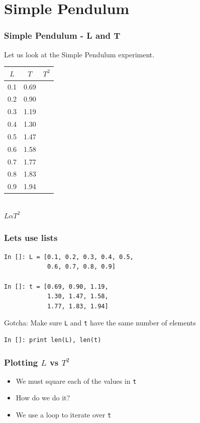 \documentclass[14pt,compress]{beamer}
\newcommand{\typ}[1]{\lstinline{#1}}
\newcommand{\kwrd}[1]{ \texttt{\textbf{\color{blue}{#1}}}  }
\begin{document}
\section{Simple Pendulum}
\begin{frame}[fragile]
\frametitle{Simple Pendulum - L and T}
Let us look at the Simple Pendulum experiment.
\begin{center}
\begin{small}
\begin{tabular}{| c | c | c |}
\hline
$L$ & $T$ & $T^2$ \\ \hline
0.1 & 0.69 & \\ \hline
0.2 & 0.90 & \\ \hline
0.3 & 1.19 & \\ \hline
0.4 & 1.30 & \\ \hline
0.5 & 1.47 & \\ \hline
0.6 & 1.58 & \\ \hline
0.7 & 1.77 & \\ \hline
0.8 & 1.83 & \\ \hline
0.9 & 1.94 & \\ \hline
\end{tabular}
\end{small}\\
\alert{$L \alpha T^2$}
\end{center}
\end{frame}

\begin{frame}[fragile]
\frametitle{Lets use lists}
\begin{lstlisting}
In []: L = [0.1, 0.2, 0.3, 0.4, 0.5,
            0.6, 0.7, 0.8, 0.9]

In []: t = [0.69, 0.90, 1.19,
            1.30, 1.47, 1.58,
            1.77, 1.83, 1.94]
\end{lstlisting}
\alert{Gotcha}: Make sure \typ{L} and \typ{t} have the same number
of elements

\begin{lstlisting}
In []: print len(L), len(t)
\end{lstlisting}

\end{frame}

\begin{frame}[fragile]
\frametitle{Plotting $L$ vs $T^2$}
\begin{itemize}
\item We must square each of the values in \typ{t}
\item How do we do it?
\item We use a \kwrd{for} loop to iterate over \typ{t}
\end{itemize}
\end{frame}
\end{document}
